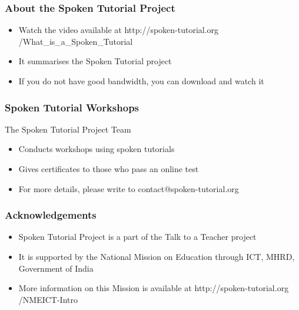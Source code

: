 \documentclass[17pt]{beamer}
\begin{document}
\begin{frame}
\frametitle{About the Spoken Tutorial Project}
\begin{itemize}
\item Watch the video available at {\color{blue} http://spoken-tutorial.org /What\_is\_a\_Spoken\_Tutorial}
\item It summarises the Spoken Tutorial project \pause
\item If you do not have good bandwidth, you can download and watch it
\end{itemize}
\end{frame}

\begin{frame}
\frametitle{Spoken Tutorial Workshops}
The Spoken Tutorial Project Team
\begin{itemize}
\item Conducts workshops using spoken tutorials
\item Gives certificates to those who pass an online test
\item For more details, please write to {\color{blue} contact@spoken-tutorial.org}
\end{itemize}
\end{frame}

\begin{frame}
\frametitle{Acknowledgements}
\begin{itemize}
\item Spoken Tutorial Project is a part of the Talk to a Teacher project
\item It is supported by the National Mission on Education through
  ICT, MHRD, Government of India
\item More information on this Mission is available at
{\color{blue} http://spoken-tutorial.org /NMEICT-Intro}
\end{itemize}
\end{frame}
\end{document}
